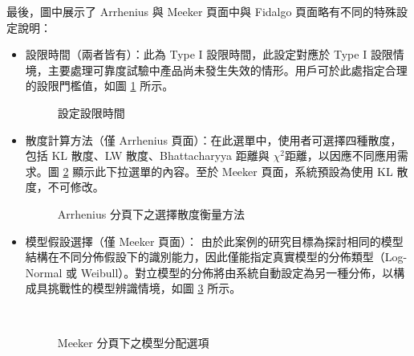 最後，圖中展示了 Arrhenius 與 Meeker 頁面中與 Fidalgo 頁面略有不同的特殊設定說明：
\begin{itemize}

\item 設限時間（兩者皆有）：此為 Type I 設限時間，此設定對應於 Type I 設限情境，主要處理可靠度試驗中產品尚未發生失效的情形。用戶可於此處指定合理的設限門檻值，如圖 \ref{fig:Arrhenius-shiny2} 所示。

\begin{figure}[H]
    \caption{設定設限時間}
    \label{fig:Arrhenius-shiny2}
\end{figure}

\item 散度計算方法（僅 Arrhenius 頁面）：在此選單中，使用者可選擇四種散度，包括 KL 散度、LW 散度、Bhattacharyya 距離與 $\chi^2$距離，以因應不同應用需求。圖 \ref{fig:Arrhenius-shiny1} 顯示此下拉選單的內容。至於 Meeker 頁面，系統預設為使用 KL 散度，不可修改。

\begin{figure}[H]
    \caption{Arrhenius 分頁下之選擇散度衡量方法}
    \label{fig:Arrhenius-shiny1}
\end{figure}

\item 模型假設選擇（僅 Meeker 頁面）： 由於此案例的研究目標為探討相同的模型結構在不同分佈假設下的識別能力，因此僅能指定真實模型的分佈類型（Log-Normal 或 Weibull）。對立模型的分佈將由系統自動設定為另一種分佈，以構成具挑戰性的模型辨識情境，如圖 \ref{fig:Meeker-shiny} 所示。

\begin{figure}[H]
\centering
{}\\
\caption{Meeker 分頁下之模型分配選項}
\label{fig:Meeker-shiny}
\end{figure}

\end{itemize}